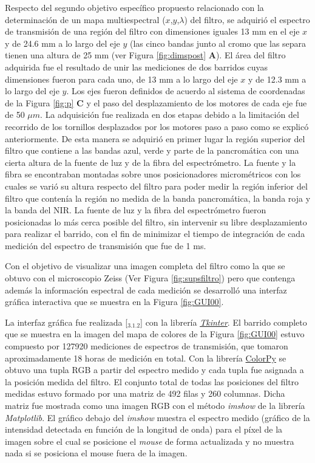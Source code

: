 Respecto del segundo objetivo específico propuesto relacionado con la determinación de un mapa multiespectral ($\textit{x}$,$\textit{y}$,$\lambda$) del filtro, se adquirió el espectro de transmisión de una región del filtro con dimensiones iguales 13 mm en el eje $\textit{x}$ y de 24.6 mm a lo largo del eje $\textit{y}$ (las cinco bandas junto al cromo que las separa tienen una altura de 25 mm (ver Figura \ref{fig:dimspost} \textbf{A}). El área del filtro adquirida fue el resultado de unir las mediciones de dos barridos cuyas dimensiones fueron para cada uno, de 13 mm a lo largo del eje $\textit{x}$ y de 12.3 mm a lo largo del eje $\textit{y}$. Los ejes fueron definidos de acuerdo al sistema de coordenadas de la Figura \ref{fig:p} \textbf{C} y el paso del desplazamiento de los motores de cada eje fue de 50 $\mu m$. La adquisición fue realizada en dos etapas debido a la limitación del recorrido de los tornillos desplazados por los motores paso a paso como se explicó anteriormente. De esta manera se adquirió en primer lugar la región superior del filtro que contiene a las bandas azul, verde y parte de la pancromática con una cierta altura de la fuente de luz y de la fibra del espectrómetro. La fuente y la fibra se encontraban montadas sobre unos posicionadores micrométricos con los cuales se varió su altura respecto del filtro para poder medir la región inferior del filtro que contenía la región no medida de la banda pancromática, la banda roja y la banda del NIR. La fuente de luz y la fibra del espectrómetro fueron posicionadas lo más cerca posible del filtro, sin intervenir su libre desplazamiento para realizar el barrido, con el fin de minimizar el tiempo de integración de cada medición del espectro de transmisión que fue de 1 ms.

Con el objetivo de visualizar una imagen completa del filtro como la que se obtuvo con el microscopio Zeiss (Ver Figura \ref{fig:supsfiltro}) pero que contenga además la información espectral de cada medición se desarrolló una interfaz gráfica interactiva que se muestra en la Figura \ref{fig:GUI00}.

La interfaz gráfica fue realizada [\href{https://github.com/jrr1984/Prototipo0\_S-D\_SpectralGUI/blob/master/spectral\_gui/main.py}{\faGithub$_{3.1.2}$}] con la librería \href{https://wiki.python.org/moin/TkInter}{\textit{Tkinter}}. El barrido completo que se muestra en la imagen del mapa de colores de la Figura \ref{fig:GUI00} estuvo compuesto por 127920 mediciones de espectros de transmisión, que tomaron aproximadamente 18 horas de medición en total. Con la librería \href{https://pypi.org/project/colorpy/}{ColorPy} se obtuvo una tupla RGB a partir del espectro medido y cada tupla fue asignada a la posición medida del filtro. El conjunto total de todas las posiciones del filtro medidas estuvo formado por una matriz de 492 filas y 260 columnas. Dicha matriz fue mostrada como una imagen RGB con el método \textit{imshow} de la librería \textit{Matplotlib}. El gráfico debajo del \textit{imshow} muestra el espectro medido (gráfico de la intensidad detectada en función de la longitud de onda) para el píxel de la imagen sobre el cual se posicione el \textit{mouse} de forma actualizada y no muestra nada si se posiciona el mouse fuera de la imagen. 

